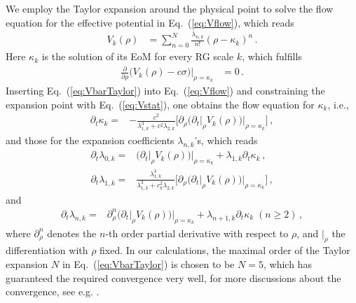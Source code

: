 \documentclass[%
reprint,
superscriptaddress,
showpacs,preprintnumbers,
 amsmath,amssymb,
 aps,
prd,
]{revtex4-1}
\def\Eq#1{Eq.~(\ref{#1})}
\begin{document}
We employ the Taylor expansion around the physical point to solve the flow equation for the effective potential in \Eq{eq:Vflow}, which reads
\begin{align}
  V_{k}(\rho)&=\sum_{n=0}^{N}\frac{\lambda_{n,k}}{n!}(\rho-\kappa_k)^n\,. \label{eq:VbarTaylor}
\end{align}
Here $\kappa_k$ is the solution of its EoM for every RG scale $k$, which fulfills
\begin{align}
  \frac{\partial}{\partial \rho}\Big(V_{k}(\rho)-c \sigma \Big)\Bigg \vert_{\rho=\kappa_k}&=0\,. \label{eq:Vstat}
\end{align}
Inserting \Eq{eq:VbarTaylor} into \Eq{eq:Vflow} and constraining the expansion point with \Eq{eq:Vstat}, one obtains the flow equation for $\kappa_k$, i.e.,
\begin{align}
  \partial_t \kappa_k=&-\frac{c^2}{\lambda_{1,k}^3+c^2 \lambda_{2,k}}\bigg[\partial_{\rho}\big(\partial_{t}\big|_{\rho} V_{k}(\rho)\big)\Big |_{\rho=\kappa_k}\bigg]\,,\label{}
\end{align}
and those for the expansion coefficients $\lambda_{n,k}$'s, which reads
\begin{align}
  \partial_t \lambda_{0,k}=&\big(\partial_{t}\big|_{\rho}V_{k}(\rho)\big)\Big |_{\rho=\kappa_k}+\lambda_{1,k}\partial_t \kappa_k\,,\\[2ex]
  \partial_t \lambda_{1,k}=&\frac{\lambda_{1,k}^3}{\lambda_{1,k}^3+ c_k^2  \lambda_{2,k}}\bigg[\partial_{\rho}\big(\partial_{t}\big|_{\rho} V_{k}( \rho)\big)\Big |_{\rho= \kappa_k}\bigg]\,,\label{}
\end{align}
and
\begin{align}
  \partial_t \lambda_{n,k}=&\partial_{\rho}^n\big(\partial_{t}\big|_{\rho} V_{k}( \rho)\big)\Big |_{\rho= \kappa_k}+\lambda_{n+1,k}\partial_t  \kappa_k\; (n\ge 2)\,, \label{}
\end{align}
where $\partial_{\rho}^n$ denotes the $n$-th order partial derivative with respect to $\rho$, and $\big|_{\rho}$ the differentiation with $\rho$ fixed. In our calculations, the maximal order of the Taylor expansion $N$ in \Eq{eq:VbarTaylor} is chosen to be $N=5$, which has guaranteed the required convergence very well, for more discussions about the convergence, see e.g. \cite{Pawlowski:2014zaa} .
\end{document}
